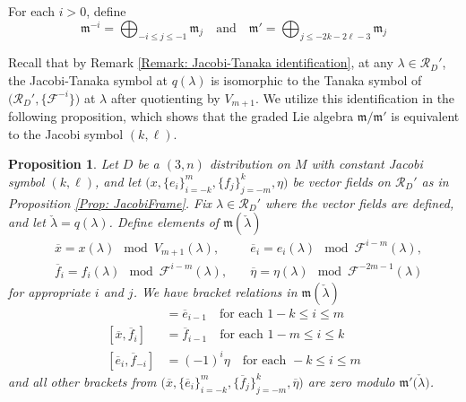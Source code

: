 \documentclass[11pt,letterpaper]{amsart}
\newtheorem{prop}[theorem]{Proposition}
\numberwithin{equation}{section}
\newcommand{\oline}{\overline}
\begin{document}
For each $i>0$, define
\begin{equation}
    \label{def: m^-i, m'}
    \mathfrak{m}^{-i} = \bigoplus_{-i\leq j \leq -1}\mathfrak{m}_j\quad \text{and}\quad \mathfrak{m}' = \bigoplus_{j\leq -2k-2\ell - 3} \mathfrak{m}_j
\end{equation}

Recall that by Remark \ref{Remark: Jacobi-Tanaka identification}, at any $\lambda\in \mathcal R_D'$, the Jacobi-Tanaka symbol at $q(\lambda)$ is isomorphic to the Tanaka symbol of $\big(\mathcal R_D',\{\mathcal F^{-i}\}\big)$ at $\lambda$ after quotienting by $V_{m+1}$. We utilize this identification in the following proposition, which shows that the graded Lie algebra $\mathfrak{m}/\mathfrak{m}'$ is equivalent to the Jacobi symbol $(k,\ell)$.
\begin{prop}
    \label{prop: m rels}
    Let $D$ be a $(3,n)$ distribution on $M$ with constant Jacobi symbol $(k,\ell)$, and let $\big(x,\{e_i\}_{i=-k}^{m},\{f_j\}_{j=-m}^k,\eta\big)$ be vector fields on $\mathcal R_D'$ as in Proposition \ref{Prop: JacobiFrame}. Fix $\lambda\in \mathcal R_D'$ where the vector fields are defined, and let $\check\lambda = q(\lambda)$. Define elements of $\mathfrak m(\check\lambda)$
    \begin{align}
        & \oline{x} = x(\lambda) \mod V_{m+1}(\lambda),\quad & \oline e_{i} = e_{i}(\lambda)\mod \mathcal{F}^{i-m}(\lambda),\\
        &  \oline f_{i} = f_{i}(\lambda)\mod \mathcal{F}^{i-m}(\lambda),\quad &\oline \eta = \eta(\lambda) \mod \mathcal{F}^{-2m-1}(\lambda)
    \end{align}
    for appropriate $i$ and $j$. We have bracket relations in $\mathfrak{m}(\check\lambda)$
    \begin{align}
        [\oline x,\oline e_i] &= \oline e_{i-1}\quad\text{for each }1-k\leq i \leq m
        \\
        [\oline x,\oline f_i] &= \oline f_{i-1}\quad\text{for each }1-m \leq i \leq k
        \\
        [\oline e_i, \oline f_{-i}] &= (-1)^i \eta\quad \text{for each } -k\leq i \leq m 
    \end{align}
    and all other brackets from $\big(\oline x,\{\oline e_i\}_{i=-k}^{m},\{\oline f_j\}_{j=-m}^k,\oline \eta\big)$ are zero modulo ${\mathfrak{m}}'\big(\check\lambda\big)$.
\end{prop}
\end{document}
